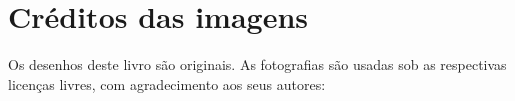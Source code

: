 \chapter*{Créditos das imagens}

\begingroup\sloppy

Os desenhos deste livro são originais. As fotografias são usadas sob
as respectivas licenças livres, com agradecimento aos seus autores:

